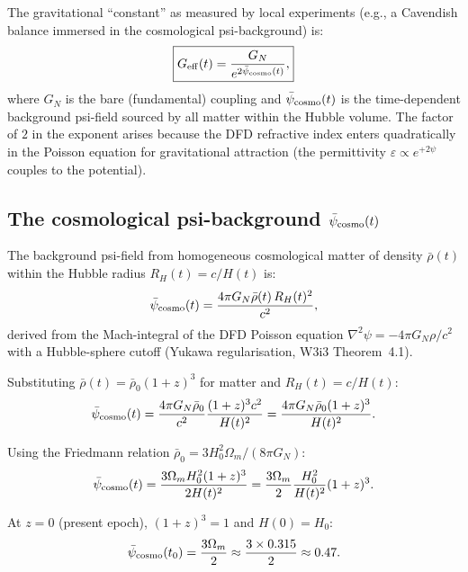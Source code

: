 \documentclass[11pt]{article}
\newcommand{\psicosmo}{\bar{\psi}_{\rm cosmo}}
\begin{document}
The gravitational ``constant'' as measured by local experiments (e.g., a Cavendish
balance immersed in the cosmological psi-background) is:
\begin{equation}
\boxed{G_{\rm eff}(t) = \frac{G_N}{e^{2\psicosmo(t)}},}
\label{eq:Geff-formula}
\end{equation}
where $G_N$ is the bare (fundamental) coupling and $\psicosmo(t)$ is the
time-dependent background psi-field sourced by all matter within the Hubble
volume. The factor of $2$ in the exponent arises because the DFD refractive
index enters quadratically in the Poisson equation for gravitational attraction
(the permittivity $\varepsilon \propto e^{+2\psi}$ couples to the potential).

\subsection{The cosmological psi-background $\psicosmo(t)$}

The background psi-field from homogeneous cosmological matter of density
$\bar{\rho}(t)$ within the Hubble radius $R_H(t) = c/H(t)$ is:
\begin{equation}
\psicosmo(t) = \frac{4\pi G_N \bar{\rho}(t)\,R_H(t)^2}{c^2},
\label{eq:psi-cosmo-def}
\end{equation}
derived from the Mach-integral of the DFD Poisson equation
$\nabla^2\psi = -4\pi G_N\rho/c^2$ with a Hubble-sphere cutoff (Yukawa
regularisation, W3i3 Theorem~4.1).

Substituting $\bar{\rho}(t) = \bar{\rho}_0(1+z)^3$ for matter and
$R_H(t) = c/H(t)$:
\begin{equation}
\psicosmo(t) = \frac{4\pi G_N \bar{\rho}_0}{c^2}\frac{(1+z)^3 c^2}{H(t)^2}
= \frac{4\pi G_N \bar{\rho}_0 (1+z)^3}{H(t)^2}.
\label{eq:psi-cosmo-explicit}
\end{equation}

Using the Friedmann relation $\bar{\rho}_0 = 3H_0^2\Omega_m/(8\pi G_N)$:
\begin{equation}
\psicosmo(t) = \frac{3\Omega_m H_0^2 (1+z)^3}{2H(t)^2}
= \frac{3\Omega_m}{2}\frac{H_0^2}{H(t)^2}(1+z)^3.
\label{eq:psi-cosmo-friedmann}
\end{equation}

At $z = 0$ (present epoch), $(1+z)^3 = 1$ and $H(0) = H_0$:
\begin{equation}
\psicosmo(t_0) = \frac{3\Omega_m}{2} \approx \frac{3\times 0.315}{2} \approx 0.47.
\label{eq:psi-cosmo-z0-friedmann}
\end{equation}
\end{document}
